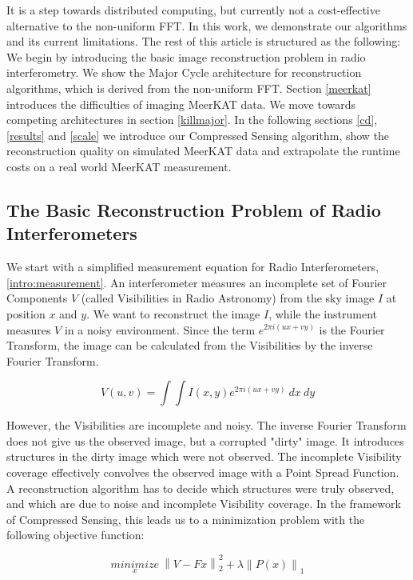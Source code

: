 It is a step towards distributed computing, but currently not a cost-effective alternative to the non-uniform FFT. In this work, we demonstrate our algorithms and its current limitations. The rest of this article is structured as the following: We begin by introducing the basic image reconstruction problem in radio interferometry. We show the Major Cycle architecture for reconstruction algorithms, which is derived from the non-uniform FFT.  Section \ref{meerkat} introduces the difficulties of imaging MeerKAT data. We  move towards competing architectures in section \ref{killmajor}. In the following sections \ref{cd}, \ref{results} and \ref{scale} we introduce our Compressed Sensing algorithm, show the reconstruction quality on simulated MeerKAT data and extrapolate the runtime costs on a real world MeerKAT measurement.


\subsection{The Basic Reconstruction Problem of Radio Interferometers}\label{intro:basic}
We start with a simplified measurement equation for Radio Interferometers, \eqref{intro:measurement}. An interferometer measures an incomplete set of Fourier Components $V$ (called Visibilities in Radio Astronomy) from the sky image $I$ at position $x$ and $y$. We want to reconstruct the image $I$, while the instrument measures $V$ in a noisy environment. Since the term $e^{2 \pi i (ux+vy)}$ is the Fourier Transform, the image can be calculated from the Visibilities by the inverse Fourier Transform.

\begin{equation}\label{intro:measurement}
V(u, v) = \int\int I(x, y) e^{2 \pi i (ux+vy)} \: dx \: dy
\end{equation}

However, the Visibilities are incomplete and noisy. The inverse Fourier Transform does not give us the observed image, but a corrupted "dirty" image.  It introduces structures in the dirty image which were not observed. The incomplete Visibility coverage effectively convolves the observed image with a Point Spread Function. A reconstruction algorithm has to decide which structures were truly observed, and which are due to noise and incomplete Visibility coverage. In the framework of Compressed Sensing, this leads us to a minimization problem with the following objective function:

\begin{equation}\label{intro:cs}
\underset{x}{minimize} \: \left \| V - Fx \right \|_2^2 + \lambda \left \| P(x) \right \|_1
\end{equation}

